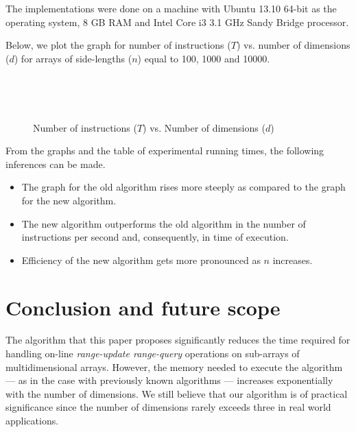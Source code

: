 \documentclass[a4paper]{article}
\begin{document}
\vspace{2 mm}
\noindent
The implementations were done on a machine with Ubuntu 13.10 64-bit as the operating system, 8 GB RAM and Intel Core i3 3.1 GHz Sandy Bridge processor.

\vspace{2 mm}
Below, we plot the graph for number of instructions ($T$) vs. number of dimensions ($d$) for arrays of side-lengths ($n$) equal to 100, 1000 and 10000.

\begin{figure}[h]
\centering
{}
\end{figure}
\pagebreak
\begin{figure}[h]
\centering
{}\\
\end{figure}
\begin{figure}[h]
\centering
{}\\
\caption{Number of instructions ($T$) vs. Number of dimensions ($d$)}
\end{figure}

\noindent
From the graphs and the table of experimental running times, the following inferences can be made.

\begin{itemize}
\item The graph for the old algorithm rises more steeply as compared to the graph for the new algorithm.
\item The new algorithm outperforms the old algorithm in the number of instructions per second and, consequently, in time of execution.
\item Efficiency of the new algorithm gets more pronounced as $n$ increases.
\end{itemize}



\section{Conclusion and future scope}
The algorithm that this paper proposes significantly reduces the time required for handling on-line \textit{range-update range-query} operations on sub-arrays of multidimensional arrays. However, the memory needed to execute the algorithm --- as in the case with previously known algorithms --- increases exponentially with the number of dimensions. We still believe that our algorithm is of practical significance since the number of dimensions rarely exceeds three in real world applications.
\end{document}
